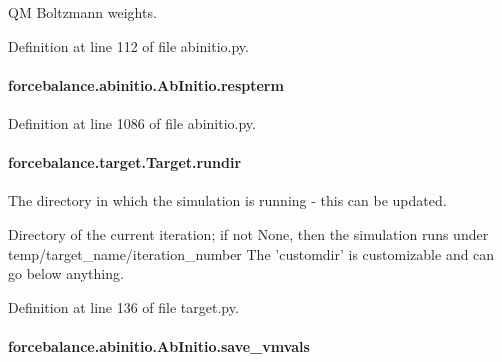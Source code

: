 Q\-M Boltzmann weights. 



Definition at line 112 of file abinitio.\-py.

\hypertarget{classforcebalance_1_1abinitio_1_1AbInitio_a689e3849518b33539442a473a41ed32d}{
\paragraph[{respterm}]{\setlength{\rightskip}{0pt plus 5cm}forcebalance.\-abinitio.\-Ab\-Initio.\-respterm\hspace{0.3cm}{\ttfamily [inherited]}}}\label{classforcebalance_1_1abinitio_1_1AbInitio_a689e3849518b33539442a473a41ed32d}


Definition at line 1086 of file abinitio.\-py.

\hypertarget{classforcebalance_1_1target_1_1Target_a6872de5b2d4273b82336ea5b0da29c9e}{
\paragraph[{rundir}]{\setlength{\rightskip}{0pt plus 5cm}forcebalance.\-target.\-Target.\-rundir\hspace{0.3cm}{\ttfamily [inherited]}}}\label{classforcebalance_1_1target_1_1Target_a6872de5b2d4273b82336ea5b0da29c9e}


The directory in which the simulation is running -\/ this can be updated. 

Directory of the current iteration; if not None, then the simulation runs under temp/target\-\_\-name/iteration\-\_\-number The 'customdir' is customizable and can go below anything.

Definition at line 136 of file target.\-py.

\hypertarget{classforcebalance_1_1abinitio_1_1AbInitio_a22037bf43728fa45f387390005e0b131}{
\paragraph[{save\-\_\-vmvals}]{\setlength{\rightskip}{0pt plus 5cm}forcebalance.\-abinitio.\-Ab\-Initio.\-save\-\_\-vmvals\hspace{0.3cm}{\ttfamily [inherited]}}}\label{classforcebalance_1_1abinitio_1_1AbInitio_a22037bf43728fa45f387390005e0b131}



